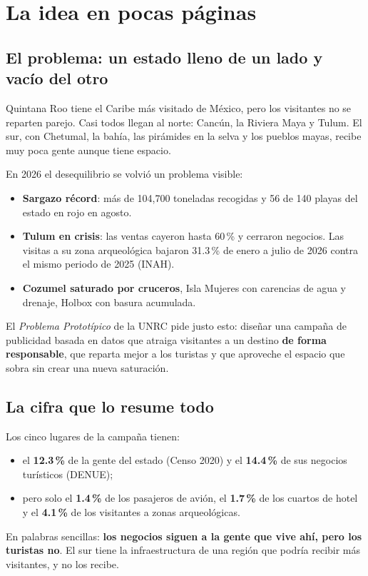 \chapter{La idea en pocas páginas}
\label{cap:s-idea}

\section{El problema: un estado lleno de un lado y vacío del otro}
Quintana Roo tiene el Caribe más visitado de México, pero los visitantes no se reparten parejo. Casi todos llegan al
norte: Cancún, la Riviera Maya y Tulum. El sur, con Chetumal, la bahía, las pirámides en la selva y los pueblos mayas,
recibe muy poca gente aunque tiene espacio.

En 2026 el desequilibrio se volvió un problema visible:
\begin{itemize}
\item \textbf{Sargazo récord}: más de 104,700 toneladas recogidas y 56 de 140 playas del estado en rojo en agosto.
\item \textbf{Tulum en crisis}: las ventas cayeron hasta 60\,\% y cerraron negocios. Las visitas a su zona arqueológica
  bajaron 31.3\,\% de enero a julio de 2026 contra el mismo periodo de 2025 (INAH).
\item \textbf{Cozumel saturado por cruceros}, Isla Mujeres con carencias de agua y drenaje, Holbox con basura acumulada.
\end{itemize}

El \emph{Problema Prototípico} de la UNRC pide justo esto: diseñar una campaña de publicidad basada en datos que atraiga
visitantes a un destino \textbf{de forma responsable}, que reparta mejor a los turistas y que aproveche el espacio que
sobra sin crear una nueva saturación.

\section{La cifra que lo resume todo}
\begin{ejemplo}
Los cinco lugares de la campaña tienen:
\begin{itemize}
\item el \textbf{12.3\,\%} de la gente del estado (Censo 2020) y el \textbf{14.4\,\%} de sus negocios turísticos (DENUE);
\item pero solo el \textbf{1.4\,\%} de los pasajeros de avión, el \textbf{1.7\,\%} de los cuartos de hotel y el
  \textbf{4.1\,\%} de los visitantes a zonas arqueológicas.
\end{itemize}
En palabras sencillas: \textbf{los negocios siguen a la gente que vive ahí, pero los turistas no}. El sur tiene la
infraestructura de una región que podría recibir más visitantes, y no los recibe.
\end{ejemplo}


